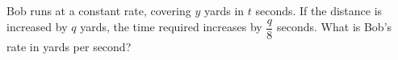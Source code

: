 Bob runs at a constant rate, covering $y$ yards in $t$ seconds. If the distance is increased by $q$ yards, the time required increases by $\dfrac {q}{8}$ seconds. What is Bob's rate in yards per second?
